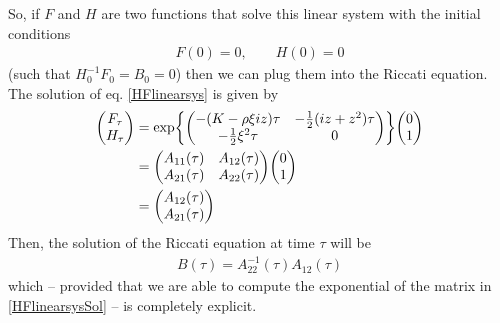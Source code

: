 So, if $F$ and $H$ are two functions that solve this linear system with the initial conditions
\begin{align}
    F(0) = 0, \qquad H(0) = 0
\end{align}
(such that $H_0^{-1}F_0=B_0=0$) then we can plug them into the Riccati equation. The solution of eq. \eqref{HFlinearsys} is given by
\begin{align}\label{HFlinearsysSol}
    \mqty(F_{\tau} \\ H_{\tau}) &= \exp{\mqty(-(K-\rho\xi iz)\tau & - \frac{1}{2}(iz+z^2)\tau \\ -\tfrac{1}{2}\xi^2\tau & 0)}\mqty(0\\1) \\
    &=
    \notag\mqty(A_{11}(\tau) & A_{12}(\tau) \\ A_{21}(\tau) & A_{22}(\tau))\mqty(0\\1) \\
    &=
    \notag\mqty(A_{12}(\tau) \\ A_{21}(\tau))
\end{align}
Then, the solution of the Riccati equation at time $\tau$ will be
\begin{eqnarray}
    B(\tau) = A_{22}^{-1}(\tau) A_{12}(\tau)
\end{eqnarray}
which -- provided that we are able to compute the exponential of the matrix in \eqref{HFlinearsysSol} -- is completely explicit. %


